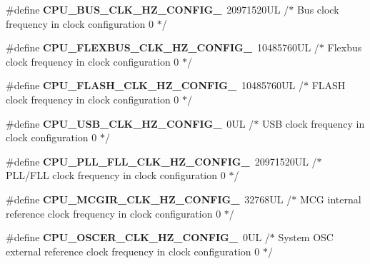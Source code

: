 \begin{DoxyCompactItemize}
\item 
\hypertarget{group___cpu__module_gaf060a047649b9537eb77354ab7917a8b}{}\#define {\bfseries C\+P\+U\+\_\+\+B\+U\+S\+\_\+\+C\+L\+K\+\_\+\+H\+Z\+\_\+\+C\+O\+N\+F\+I\+G\+\_}~20971520\+U\+L /$\ast$ Bus clock frequency in clock configuration 0 $\ast$/\label{group___cpu__module_gaf060a047649b9537eb77354ab7917a8b}

\item 
\hypertarget{group___cpu__module_ga706c0d4dd14c93181b7a99badddc9a51}{}\#define {\bfseries C\+P\+U\+\_\+\+F\+L\+E\+X\+B\+U\+S\+\_\+\+C\+L\+K\+\_\+\+H\+Z\+\_\+\+C\+O\+N\+F\+I\+G\+\_}~10485760\+U\+L /$\ast$ Flexbus clock frequency in clock configuration 0 $\ast$/\label{group___cpu__module_ga706c0d4dd14c93181b7a99badddc9a51}

\item 
\hypertarget{group___cpu__module_ga09c9820f38d931a0400b832d2582c6f7}{}\#define {\bfseries C\+P\+U\+\_\+\+F\+L\+A\+S\+H\+\_\+\+C\+L\+K\+\_\+\+H\+Z\+\_\+\+C\+O\+N\+F\+I\+G\+\_}~10485760\+U\+L /$\ast$ F\+L\+A\+S\+H clock frequency in clock configuration 0 $\ast$/\label{group___cpu__module_ga09c9820f38d931a0400b832d2582c6f7}

\item 
\hypertarget{group___cpu__module_ga7bf843fdf59af5fcaf48bea898884a3e}{}\#define {\bfseries C\+P\+U\+\_\+\+U\+S\+B\+\_\+\+C\+L\+K\+\_\+\+H\+Z\+\_\+\+C\+O\+N\+F\+I\+G\+\_}~0\+U\+L /$\ast$ U\+S\+B clock frequency in clock configuration 0 $\ast$/\label{group___cpu__module_ga7bf843fdf59af5fcaf48bea898884a3e}

\item 
\hypertarget{group___cpu__module_gad2aaa2918b640ae3833fc84e8f983c3c}{}\#define {\bfseries C\+P\+U\+\_\+\+P\+L\+L\+\_\+\+F\+L\+L\+\_\+\+C\+L\+K\+\_\+\+H\+Z\+\_\+\+C\+O\+N\+F\+I\+G\+\_}~20971520\+U\+L /$\ast$ P\+L\+L/\+F\+L\+L clock frequency in clock configuration 0 $\ast$/\label{group___cpu__module_gad2aaa2918b640ae3833fc84e8f983c3c}

\item 
\hypertarget{group___cpu__module_ga860e7441eac7d5e35385bcd62b019d9d}{}\#define {\bfseries C\+P\+U\+\_\+\+M\+C\+G\+I\+R\+\_\+\+C\+L\+K\+\_\+\+H\+Z\+\_\+\+C\+O\+N\+F\+I\+G\+\_}~32768\+U\+L /$\ast$ M\+C\+G internal reference clock frequency in clock configuration 0 $\ast$/\label{group___cpu__module_ga860e7441eac7d5e35385bcd62b019d9d}

\item 
\hypertarget{group___cpu__module_ga2960ebfe6475f475999ea8f1d5448483}{}\#define {\bfseries C\+P\+U\+\_\+\+O\+S\+C\+E\+R\+\_\+\+C\+L\+K\+\_\+\+H\+Z\+\_\+\+C\+O\+N\+F\+I\+G\+\_}~0\+U\+L /$\ast$ System O\+S\+C external reference clock frequency in clock configuration 0 $\ast$/\label{group___cpu__module_ga2960ebfe6475f475999ea8f1d5448483}


\end{DoxyCompactItemize}
